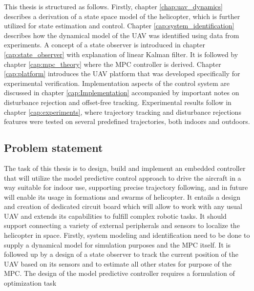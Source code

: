 This thesis is structured as follows. Firstly, chapter \ref{chap:uav_dynamics} describes a derivation of a state space model of the helicopter, which is further utilized for state estimation and control. Chapter \ref{cap:system_identification} describes how the dynamical model of the UAV was identified using data from experiments. A concept of a state observer is introduced in chapter \ref{cap:state_observer} with explanation of linear Kalman filter. It is followed by chapter \ref{cap:mpc_theory} where the MPC controller is derived. Chapter \ref{cap:platform} introduces the UAV platform that was developed specifically for experimental verification. Implementation aspects of the control system are discussed in chapter \ref{cap:Implementation} accompanied by important notes on disturbance rejection and offset-free tracking. Experimental results follow in chapter \ref{cap:experiments}, where trajectory tracking and disturbance rejections features were tested on several predefined trajectories, both indoors and outdoors.

\subsection{Problem statement}

The task of this thesis is to design, build and implement an embedded controller that will utilize the model predictive control approach to drive the aircraft in a way suitable for indoor use, supporting precise trajectory following, and in future will enable its usage in formations and swarms of helicopter. It entails a design and creation of dedicated circuit board which will allow to work with any usual UAV and extends its capabilities to fulfill complex robotic tasks. It should support connecting a variety of external peripherals and sensors to localize the helicopter in space. Firstly, system modeling and identification need to be done to supply a dynamical model for simulation purposes and the MPC itself. It is followed up by a design of a state observer to track the current position of the UAV based on its sensors and to estimate all other states for purpose of the MPC. The design of the model predictive controller requires a formulation of optimization task

